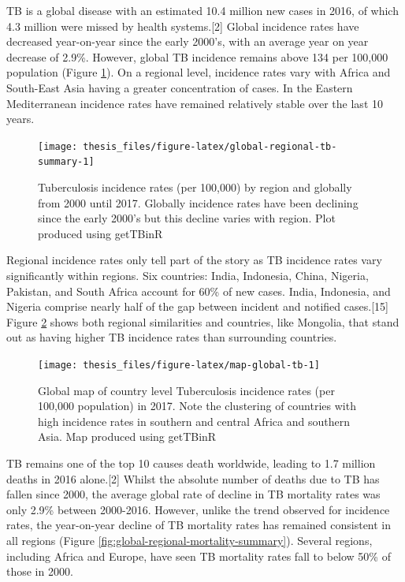 \documentclass[11pt,twoside]{bristolthesis}
\begin{document}
  TB is a global disease with an estimated 10.4 million new cases in 2016, of which 4.3 million were missed by health systems.{[}2{]} Global incidence rates have decreased year-on-year since the early 2000's, with an average year on year decrease of 2.9\%. However, global TB incidence remains above 134 per 100,000 population (Figure \ref{fig:global-regional-tb-summary}). On a regional level, incidence rates vary with Africa and South-East Asia having a greater concentration of cases. In the Eastern Mediterranean incidence rates have remained relatively stable over the last 10 years.
  \begin{figure}
  
  {\centering \texttt{[image: thesis\_files/figure-latex/global-regional-tb-summary-1]} 
  
  }
  
  \caption{Tuberculosis incidence rates (per 100,000) by region and globally from 2000 until 2017. Globally incidence rates have been declining since the early 2000's but this decline varies with region. Plot produced using getTBinR}\label{fig:global-regional-tb-summary}
  \end{figure}
  Regional incidence rates only tell part of the story as TB incidence rates vary significantly within regions. Six countries: India, Indonesia, China, Nigeria, Pakistan, and South Africa account for 60\% of new cases. India, Indonesia, and Nigeria comprise nearly half of the gap between incident and notified cases.{[}15{]} Figure \ref{fig:map-global-tb} shows both regional similarities and countries, like Mongolia, that stand out as having higher TB incidence rates than surrounding countries.
  \begin{figure}
  
  {\centering \texttt{[image: thesis\_files/figure-latex/map-global-tb-1]} 
  
  }
  
  \caption{Global map of country level Tuberculosis incidence rates (per 100,000 population) in 2017. Note the clustering of countries with high incidence rates in southern and central Africa and southern Asia. Map produced using getTBinR}\label{fig:map-global-tb}
  \end{figure}
  TB remains one of the top 10 causes death worldwide, leading to 1.7 million deaths in 2016 alone.{[}2{]} Whilst the absolute number of deaths due to TB has fallen since 2000, the average global rate of decline in TB mortality rates was only 2.9\% between 2000-2016. However, unlike the trend observed for incidence rates, the year-on-year decline of TB mortality rates has remained consistent in all regions (Figure \ref{fig:global-regional-mortality-summary}). Several regions, including Africa and Europe, have seen TB mortality rates fall to below 50\% of those in 2000.
\end{document}
